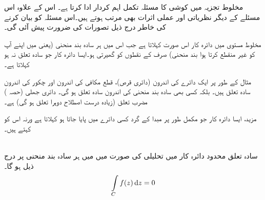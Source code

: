  مخلوط تجزیہ میں کوشی کا مسئلہ تکمل اہم کردار ادا کرتا ہے۔ اس کے علاوہ اس مسئلے کے  دیگر نظریاتی اور عملی اثرات بھی مرتب ہوتے ہیں۔اس مسئلہ کو بیان کرنے کی خاطر درج ذیل تصورات کی ضرورت پیش آئی گی۔

مخلوط مستوی میں دائرہ کار  اس صورت  کہلاتا ہے جب اس میں ہر سادہ بند منحنی (یعنی  میں  اپنے آپ کو غیر منقطع کرتا ہوا بند منحنی)  صرف  کے نقطوں کو گھیرتی ہو۔ایسا دائرہ کار جو سادہ تعلق  نہ ہو  کہلاتا ہے۔

مثال کے طور پر ایک دائرے کی اندرون (دائری قرص)، قطع مکافی کی اندرون اور چکور کی اندرون سادہ تعلق ہیں۔ بلکہ کسی بھی سادہ بند منحنی کی اندرون سادہ تعلق ہو گی۔ دائری جھلی  (حصہ ) مضرب تعلق (زیادہ درست اصطلاح دوہرا تعلق ہو گی) ہے۔

مزید، ایسا دائرہ کار  جو مکمل طور پر مبدا کے گرد کسی دائرے میں پایا جاتا ہو  کہلاتا ہے ورنہ  اس  کو  کہتے ہیں۔

\quad {}\\
سادہ تعلق محدود دائرہ کار  میں تحلیلی  کی صورت میں  میں ہر سادہ  بند منحنی  پر درج ذیل ہو گا۔
\begin{align}\label{مساوات_مخلوط_تکمل_مسئلہ_کوشی_تکمل}
\int\limits_C f(z)\dif z=0
\end{align}

